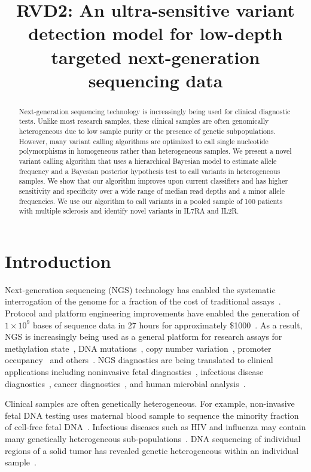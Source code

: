 \documentclass[11pt,reqno]{amsart}
\title[RVD2]{RVD2: An ultra-sensitive variant detection model for low-depth targeted next-generation sequencing data}
\author{}
\begin{document}
\begin{abstract}
Next-generation sequencing technology is increasingly being used for clinical diagnostic tests. Unlike most research samples, these clinical samples are often genomically heterogeneous due to low sample purity or the presence of genetic subpopulations. However, many variant calling algorithms are optimized to call single nucleotide polymorphisms in homogeneous rather than heterogeneous samples. We present a novel variant calling algorithm that uses a hierarchical Bayesian model to estimate allele frequency and a Bayesian posterior hypothesis test to call variants in heterogeneous samples. We show that our algorithm improves upon current classifiers and has higher sensitivity and specificity over a wide range of median read depths and a minor allele frequencies. We use our algorithm to call variants in a pooled sample of 100 patients with multiple sclerosis and identify novel variants in IL7RA and IL2R.
\end{abstract}

\maketitle

\section{Introduction}

Next-generation sequencing (NGS) technology has enabled the systematic interrogation of the genome for a fraction of the cost of traditional assays~\citep{Koboldt:2013kw}. Protocol and platform engineering improvements have enabled the generation of $1\times10^9$ bases of sequence data in 27 hours for approximately \$1000~\citep{Quail:2012hf}. As a result, NGS is increasingly being used as a general platform for research assays for methylation state~\citep{Laird}, DNA mutations~\citep{Consortium:2013co}, copy number variation~\citep{Alkan:2009cr}, promoter occupancy~\citep{Ouyang:2009hc} and others~\citep{Rivera:2013ee}. NGS diagnostics are being translated to clinical applications including noninvasive fetal diagnostics~\citep{Kitzman:2012hea}, infectious disease diagnostics~\citep{Capobianchi:2012em}, cancer diagnostics~\citep{Navin:2010gu}, and human microbial analysis~\citep{Consortium:2013iz}. 

Clinical samples are often genetically heterogeneous. For example, non-invasive fetal DNA testing uses maternal blood sample to sequence the minority fraction of cell-free fetal DNA~\citep{Fan:2008di}. Infectious diseases such as HIV and influenza may contain many genetically heterogeneous sub-populations~\citep{Flaherty:2011ja, Ghedin:2010ie}. DNA sequencing of individual regions of a solid tumor has revealed genetic heterogeneous within an individual sample~\citep{Navin:2010gu}.  
\end{document}
